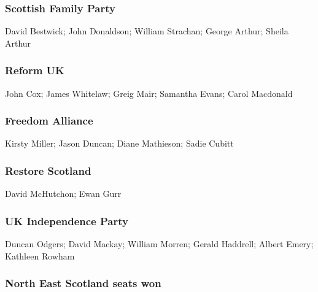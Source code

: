 \begin{resultsiii}
\subsubsection*{Scottish Family Party}
David Bestwick; John Donaldson; William Strachan; George Arthur; Sheila Arthur

\subsubsection*{Reform UK}
John Cox; James Whitelaw; Greig Mair; Samantha Evans; Carol Macdonald

\subsubsection*{Freedom Alliance}
Kirsty Miller; Jason Duncan; Diane Mathieson; Sadie Cubitt

\subsubsection*{Restore Scotland}
David McHutchon; Ewan Gurr

\subsubsection*{UK Independence Party}
Duncan Odgers; David Mackay; William Morren; Gerald Haddrell; Albert Emery; Kathleen Rowham
\end{resultsiii}

\subsubsection*{North East Scotland seats won}

